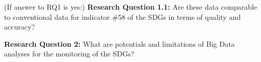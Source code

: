 			\bigskip
				
				\begin{tcolorbox}
					(If answer to RQ1 is yes:) \textbf{Research Question 1.1:} \smallskip Are these data comparable to conventional data for indicator \#58 of the SDGs in terms of quality and accuracy?
				\end{tcolorbox}
				
			\bigskip
				
				\begin{tcolorbox}
					\textbf{Research Question 2:} \smallskip What are potentials and limitations of Big Data analyses for the monitoring of the SDGs?
				\end{tcolorbox}

			\bigskip
				
	
			